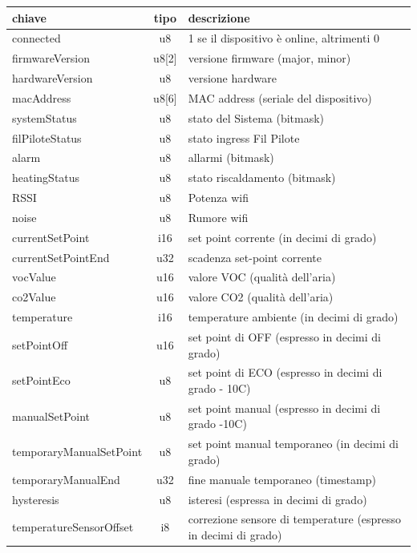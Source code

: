 \documentclass[12pt,a4paper,twoside,titlepage]{book}
\begin{document}
\begin{center}
\begin{longtable}{| p{5cm} | c | p{8cm} |}
    \hline
    \textbf{chiave} & \textbf{tipo} & \textbf{descrizione} \\ \hline
    connected & u8 & 1 se il dispositivo è online, altrimenti 0 \\ \hline
    firmwareVersion & u8[2] & versione \gls{firmware} (major, minor) \\ \hline
    hardwareVersion & u8 & versione hardware \\ \hline
    macAddress & u8[6] & MAC address (seriale del dispositivo) \\ \hline
    systemStatus & u8 & stato del Sistema (bitmask) \\ \hline
    filPiloteStatus & u8 & stato ingress Fil Pilote \\ \hline
    alarm & u8 & allarmi (bitmask)\\ \hline
    heatingStatus & u8 & stato riscaldamento (bitmask)\\ \hline
    RSSI & u8 & Potenza \Gls{wifi}\\ \hline
    noise & u8 & Rumore \Gls{wifi}\\ \hline
    currentSetPoint & i16 & set point corrente (in decimi di grado)\\ \hline
    currentSetPointEnd & u32 & scadenza set-point corrente\\ \hline
    vocValue & u16 & valore VOC (qualità dell’aria)\\ \hline
    co2Value & u16 & valore CO2 (qualità dell’aria)\\ \hline
    temperature & i16 & temperature ambiente (in decimi di grado)\\ \hline
    setPointOff & u16 & set point di OFF (espresso in decimi di grado)\\ \hline
    setPointEco & u8 & set point di ECO (espresso in decimi di grado - 10C)\\ \hline
    manualSetPoint & u8 & set point manual (espresso in decimi di grado -10C)\\ \hline
    temporaryManualSetPoint & u8 & set point manual temporaneo (in decimi di grado)\\ \hline
    temporaryManualEnd & u32 & fine manuale temporaneo (timestamp)\\ \hline
    hysteresis & u8 & isteresi (espressa in decimi di grado)\\ \hline
    temperatureSensorOffset & i8 & correzione sensore di temperature (espresso in decimi di grado)\\ \hline

\end{longtable}
\end{center}
\end{document}
